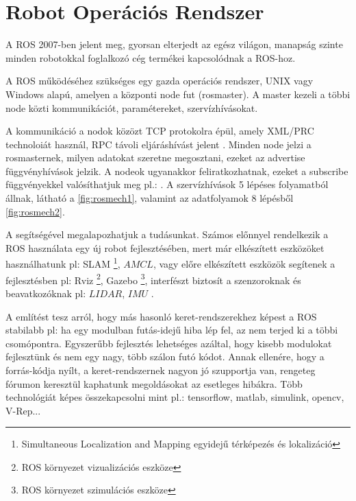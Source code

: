 

\section{Robot Operációs Rendszer} 
A ROS 2007-ben jelent meg, gyorsan elterjedt az egész világon, manapság szinte minden robotokkal foglalkozó cég termékei kapcsolódnak a ROS-hoz.

A ROS működéséhez szükséges egy gazda operációs rendszer, UNIX vagy Windows alapú, amelyen a központi node fut (rosmaster). A master kezeli a többi node közti kommunikációt, paramétereket, szervízhívásokat.

A kommunikáció a nodok közözt TCP protokolra épül, amely XML/PRC technoloiát használ, RPC távoli eljáráshívást jelent \cite{xmlrpc}.
Minden node jelzi a rosmasternek, milyen adatokat szeretne megosztani, ezeket az advertise függvényhívások jelzik. A nodeok ugyanakkor feliratkozhatnak, ezeket a subscribe függvényekkel valósíthatjuk meg pl.: \cite{rossubpubexample}.
A szervízhívások 5 lépéses folyamatból állnak, látható a \ref{fig:rosmech1}, valamint az adatfolyamok 8 lépésből \ref{fig:rosmech2}.



\renewcommand{\img}{AktualisTudomany/rosmech1.jpg}
\renewcommand{\sources}{Forrás: http://answers.ros.org}
\renewcommand{\captionn}{ROS kommunikációs mechanizmus szervizhívásokra}
\renewcommand{\aspectratioPic}{0.7}
\renewcommand{\figlabel}{rosmech1}



\renewcommand{\img}{AktualisTudomany/rosmech2.jpg}
\renewcommand{\sources}{Forrás: http://answers.ros.org}
\renewcommand{\captionn}{ROS kommunikációs mechanizmus adatfolyamokra}
\renewcommand{\aspectratioPic}{0.7}
\renewcommand{\figlabel}{rosmech2}


A \cite{lentin2015} \cite{NagyPirosKonyv} segítségével megalapozhatjuk a tudásunkat. Számos előnnyel rendelkezik a ROS használata egy új robot fejlesztésében, mert már elkészített eszközöket használhatunk pl: SLAM \footnote{ Simultaneous Localization and Mapping egyidejű térképezés és lokalizáció}, $AMCL$, vagy előre elkészített eszközök segítenek a fejlesztésben pl: Rviz  \footnote{ROS környezet vizualizációs eszköze}, Gazebo \footnote{ROS környezet szimulációs eszköze}, interfészt biztosít a szenzoroknak és beavatkozóknak pl: $LIDAR$, $IMU$ .

A \cite{lentin2015} említést tesz arról, hogy más hasonló keret-rendszerekhez képest a ROS stabilabb pl: ha egy modulban futás-idejű hiba lép fel, az nem terjed ki a többi csomópontra.
Egyszerűbb fejlesztés lehetséges azáltal, hogy kisebb modulokat fejlesztünk és nem egy nagy, több szálon futó kódot. Annak ellenére, hogy a forrás-kódja nyílt, a keret-rendszernek nagyon jó szupportja van, rengeteg fórumon keresztül kaphatunk megoldásokat az esetleges hibákra. Több technológiát képes összekapcsolni mint pl.: tensorflow, matlab, simulink, opencv, V-Rep...


